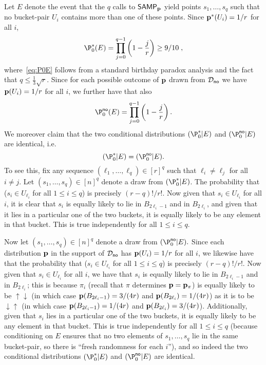 Let $E$ denote the event that the $q$ calls to ${\sf SAMP}_{\mathbf{p}}$
yield points $s_1,\dots,s_q$ such that no bucket-pair $U_i$
contains more than one of these points.
Since $\mathbf{p}^\ast(U_i)=1/r$ for all $i$,
\begin{equation} \label{eq:P0E}
\P^\ast_0(E) = \prod_{j=0}^{q-1} \left(1 - {\frac j r}\right) \geq 9/10\;,
\end{equation}
where~\cref{eq:P0E} follows from a standard birthday paradox
analysis and the fact that $q \leq {\frac{1}3} \sqrt{r}.$
Since for each possible outcome of $\mathbf{p}$ drawn
from $\mathcal{D}_{\textsf{no}}$ we have $\mathbf{p}(U_i)=1/r$ for all $i$, we
further have
that also
\begin{equation} \label{eq:PNOE}
\P^{\text \no}_0(E)= \prod_{j=0}^{q-1} \left(1 - {\frac j r}\right) .
\end{equation}
We moreover claim that
the two conditional distributions
$(\P^\ast_0|E)$ and $(\P^{\text \no}_0|E)$ are identical,
i.e.
\begin{equation} \label{eq:cond-identical}
(\P^\ast_0|E) = (\P^{\text \no}_0|E).
\end{equation}
To see this, fix any sequence $(\ell_1,\dots,\ell_q) \in [r]^q$
such that $\ell_i \neq \ell_j$ for all $i \neq j$.
Let \mbox{$(s_1,\dots,s_q) \in [n]^q$} denote a draw from $(\P^\ast_0|E)$.
The probability that ($s_i \in U_{\ell_i}$ for all $1 \leq i \leq q$)
is precisely $(r-q)!/r!$. Now given that $s_i \in U_{\ell_i}$ for all $i$, it is clear that
$s_i$ is equally likely to lie in $B_{2\ell_i-1}$ and in $B_{2 \ell_i}$,
and given that it lies in a particular
one of the two buckets, it is equally likely
to be any element in that bucket.  This is true independently for all
$1 \leq i \leq q.$

Now let $(s_1,\dots,s_q) \in [n]^q$ denote
a draw from $(\P^{\text \no}_0|E).$
Since each distribution $\mathbf{p}$ in the support of $\mathcal{D}_{\textsf{no}}$
has $\mathbf{p}(U_i)=1/r$ for all $i$, we likewise have
that the probability that ($s_i \in U_{\ell_i}$ for all $1 \leq i \leq q$)
is precisely $(r-q)!/r!$. Now given that $s_i \in U_{\ell_i}$ for all $i$, we have that
$s_i$ is equally likely to lie in $B_{2\ell_i-1}$ and in $B_{2 \ell_i}$;
this is because $\pi_i$ (recall that $\pi$ determines $\mathbf{p}=\mathbf{p}_\pi$)
is equally likely to be $\uparrow \downarrow$ (in which case
$\mathbf{p}(B_{2 \ell_i-1})= 3/(4r)$ and $\mathbf{p}(B_{2 \ell_i})=1/(4r)$)
as it is to be $\downarrow \uparrow$ (in which case
$\mathbf{p}(B_{2 \ell_i-1})=1/(4r)$ and $\mathbf{p}(B_{2\ell_i})=3/(4r)$).
Additionally,
 given that $s_i$ lies in a particular one of the two buckets, it is equally
likely to be any element in that bucket.  This is true
independently for all $1 \leq i \leq q$ (because conditioning on $E$
ensures that no two elements of $s_1,\dots,s_q$
lie in the same bucket-pair, so there is
``fresh randomness for each $i$''),
and so indeed the two conditional distributions
$(\P^\ast_0|E)$ and $(\P^{\text \no}_0|E)$ are identical.


